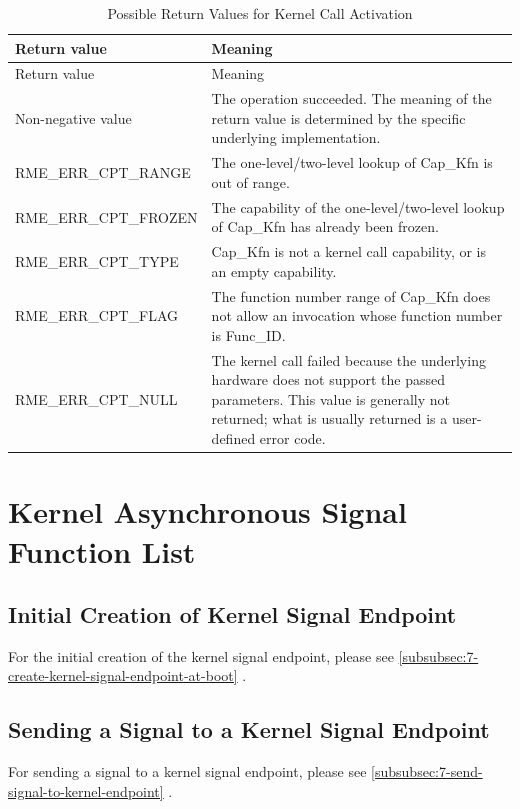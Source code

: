 \begin{xltabular}{\textwidth}{@{}>{\hsize\raggedright\arraybackslash}X>{\hsize\raggedright\arraybackslash}X@{}}
\caption{Possible Return Values for Kernel Call Activation}\label{tab:6-4-kernel-call-activation-return-values}\\
\toprule
Return value & Meaning\tabularnewline
\endfirsthead
\toprule
Return value & Meaning\tabularnewline
\midrule
\endhead
\bottomrule
\endlastfoot
    Non-negative value & The operation succeeded. The meaning of the return value is determined by the specific underlying implementation.\tabularnewline
    RME\_ERR\_CPT\_RANGE & The one-level/two-level lookup of Cap\_Kfn is out of range.\tabularnewline
    RME\_ERR\_CPT\_FROZEN & The capability of the one-level/two-level lookup of Cap\_Kfn has already been frozen.\tabularnewline
    RME\_ERR\_CPT\_TYPE & Cap\_Kfn is not a kernel call capability, or is an empty capability.\tabularnewline
    RME\_ERR\_CPT\_FLAG & The function number range of Cap\_Kfn does not allow an invocation whose function number is Func\_ID.\tabularnewline
    RME\_ERR\_CPT\_NULL & The kernel call failed because the underlying hardware does not support the passed parameters. This value is generally not returned; what is usually returned is a user-defined error code.\tabularnewline
\end{xltabular}
\nopagebreak[4]

\section{Kernel Asynchronous Signal Function List}\label{sec:6-async-signal-function-list}

\subsection{Initial Creation of Kernel Signal Endpoint}\label{subsec:6-kernel-signal-endpoint-initial-creation}

For the initial creation of the kernel signal endpoint, please see \ref{subsubsec:7-create-kernel-signal-endpoint-at-boot}
.

\subsection{Sending a Signal to a Kernel Signal Endpoint}\label{subsec:6-send-signal-to-kernel-signal-endpoint}

For sending a signal to a kernel signal endpoint, please see \ref{subsubsec:7-send-signal-to-kernel-endpoint}
.

